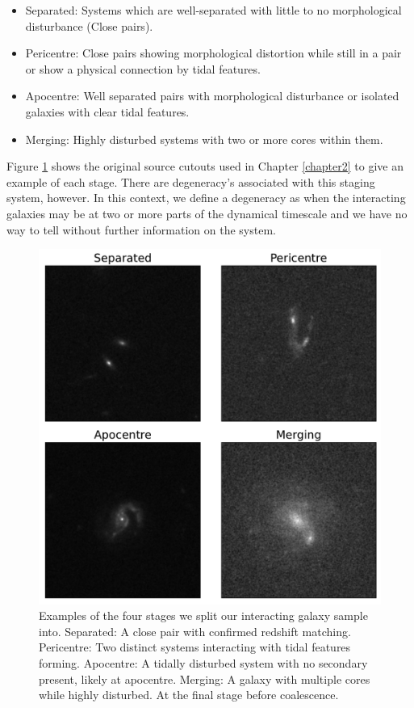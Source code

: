 \begin{itemize}
    \item Separated: Systems which are well-separated with little to no morphological disturbance (Close pairs).
    \item Pericentre: Close pairs showing morphological distortion while still in a pair or show a physical connection by tidal features.
    \item Apocentre: Well separated pairs with morphological disturbance or isolated galaxies with clear tidal features.
    \item Merging: Highly disturbed systems with two or more cores within them.
\end{itemize}

\noindent Figure \ref{fig:stages} shows the original source cutouts used in Chapter \ref{chapter2} to give an example of each stage. There are degeneracy's associated with this staging system, however. In this context, we define a degeneracy as when the interacting galaxies may be at two or more parts of the dynamical timescale and we have no way to tell without further information on the system.

\begin{figure}
    \centering
    \includegraphics[width=\textwidth]{Chapter3/figures/examples-stages.pdf}
    \caption[Examples of the four stages we split our interacting galaxy sample into.]{Examples of the four stages we split our interacting galaxy sample into. Separated: A close pair with confirmed redshift matching. Pericentre: Two distinct systems interacting with tidal features forming. Apocentre: A tidally disturbed system with no secondary present, likely at apocentre. Merging: A galaxy with multiple cores while highly disturbed. At the final stage before coalescence.}
    \label{fig:stages}
\end{figure}

